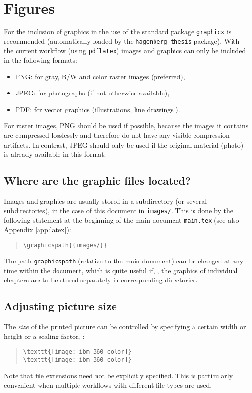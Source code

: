 \section{Figures}

For the inclusion of graphics in \latex the use of the
standard package \texttt{graphicx} \cite{Carlisle2021} is recommended
(automatically loaded by the \texttt{hagenberg-thesis} package).
With the current workflow (using \texttt{pdflatex}) images and graphics
can only be included in the following formats:
%
\begin{itemize}
    \item PNG: for gray, B/W and color raster images (preferred),
    \item JPEG: for photographs (if not otherwise available),
    \item PDF: for vector graphics (illustrations, line drawings \etc).
\end{itemize}
%
For raster images, PNG should be used if possible, because the images it
contains are compressed losslessly and therefore do not have any visible
compression artifacts. In contrast, JPEG should only be used if the original
material (photo) is already available in this format.


\subsection{Where are the graphic files located?}

Images and graphics are usually stored in a subdirectory (or several
subdirectories), in the case of this document in \nolinkurl{images/}. This is
done by the following statement at the beginning of the main document
\nolinkurl{main.tex} (see also Appendix \ref{app:latex}):
%
\begin{quote}
    \verb!\graphicspath{{images/}}!
\end{quote}
%
The path \texttt{graphicspath} (relative to the main document) can be changed
at any time within the document, which is quite useful if, \eg, the graphics
of individual chapters are to be stored separately in corresponding directories.


\subsection{Adjusting picture size}

The \emph{size} of the printed picture can be controlled by specifying a
certain width or height or a scaling factor, \eg:
%
\begin{quote}
    \verb!\texttt{[image: ibm-360-color]}! \\
    \verb!\texttt{[image: ibm-360-color]}!
\end{quote}
%
Note that file extensions need not be explicitly specified.
This is particularly convenient when multiple workflows with different file
types are used.



